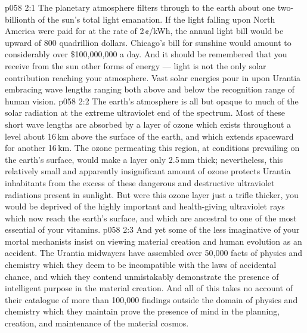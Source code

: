\vs p058 2:1 The planetary atmosphere filters through to the earth about one two\hyp{}billionth of the sun’s total light emanation. If the light falling upon North America were paid for at the rate of 2\,¢/kWh, the annual light bill would be upward of 800 quadrillion dollars. Chicago’s bill for sunshine would amount to considerably over \$100,000,000 a day. And it should be remembered that you receive from the sun other forms of energy --- light is not the only solar contribution reaching your atmosphere. Vast solar energies pour in upon Urantia embracing wave lengths ranging both above and below the recognition range of human vision.
\vs p058 2:2 \pc The earth’s atmosphere is all but opaque to much of the solar radiation at the extreme ultraviolet end of the spectrum. Most of these short wave lengths are absorbed by a layer of ozone which exists throughout a level about 16\,km above the surface of the earth, and which extends spaceward for another 16\,km. The ozone permeating this region, at conditions prevailing on the earth’s surface, would make a layer only 2.5\,mm thick; nevertheless, this relatively small and apparently insignificant amount of ozone protects Urantia inhabitants from the excess of these dangerous and destructive ultraviolet radiations present in sunlight. But were this ozone layer just a trifle thicker, you would be deprived of the highly important and health\hyp{}giving ultraviolet rays which now reach the earth’s surface, and which are ancestral to one of the most essential of your vitamins.
\vs p058 2:3 And yet some of the less imaginative of your mortal mechanists insist on viewing material creation and human evolution as an accident. The Urantia midwayers have assembled over 50,000 facts of physics and chemistry which they deem to be incompatible with the laws of accidental chance, and which they contend unmistakably demonstrate the presence of intelligent purpose in the material creation. And all of this takes no account of their catalogue of more than 100,000 findings outside the domain of physics and chemistry which they maintain prove the presence of mind in the planning, creation, and maintenance of the material cosmos.
